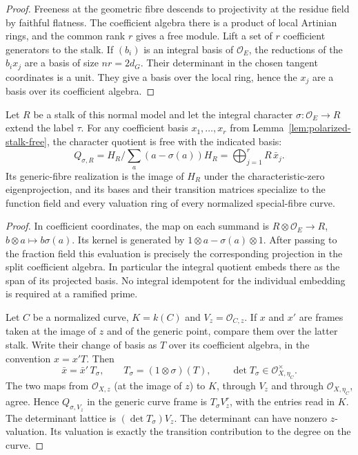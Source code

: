 \begin{proof}
Freeness at the geometric fibre descends to projectivity at the
residue field by faithful flatness. The coefficient algebra there
is a product of local Artinian rings, and the common rank \(r\)
gives a free module. Lift a set of \(r\) coefficient generators
to the stalk. If \((b_i)\) is an integral basis of \(\mathcal O_E\),
the reductions of the \(b_i x_j\) are a basis of size \(nr=2d_G\).
Their determinant in the chosen tangent coordinates is a unit.
They give a basis over the local ring, hence the \(x_j\) are a
basis over its coefficient algebra.
\end{proof}

\begin{auxlemma}
\label{lem:polarized-stalk-evaluation}
Let \(R\) be a stalk of this normal model and let the integral
character \(\sigma:\mathcal O_E\to R\) extend the label \(\tau\).
For any coefficient basis \(x_1,\ldots,x_r\) from
Lemma~\ref{lem:polarized-stalk-free}, the character quotient is
free with the indicated basis:
\[
 Q_{\sigma,R}=H_R/\sum_a(a-\sigma(a))H_R
             =\bigoplus_{j=1}^r R\,\bar x_j .
\]
Its generic-fibre realization is the image of \(H_R\) under
the characteristic-zero eigenprojection, and its bases and their
transition matrices specialize to the function field and every
valuation ring of every normalized special-fibre curve.
\end{auxlemma}
\begin{proof}
In coefficient coordinates, the map on each summand is
\(R\otimes\mathcal O_E\to R\), \(b\otimes a\mapsto b\sigma(a)\).
Its kernel is generated by \(1\otimes a-\sigma(a)\otimes1\).
After passing to the fraction field this evaluation is precisely the
corresponding projection in the split coefficient algebra. In
particular the integral quotient embeds there as the span of its
projected basis. No integral idempotent for the individual embedding
is required at a ramified prime.

Let \(C\) be a normalized curve, \(K=k(C)\) and
\(V_z=\mathcal O_{C,z}\). If \(x\) and \(x'\) are frames taken
at the image of \(z\) and of the generic point, compare them over
the latter stalk. Write their change of basis as \(T\) over its
coefficient algebra, in the convention \(x=x'T\). Then
\[
       \bar x=\bar x'\,T_\sigma,\qquad
       T_\sigma=(1\otimes\sigma)(T),\qquad
       \det T_\sigma\in\mathcal O_{X,\eta_C}^{\times}.
\]
The two maps from \(\mathcal O_{X,z}\) (at the image of \(z\))
to \(K\), through \(V_z\) and through \(\mathcal O_{X,\eta_C}\),
agree. Hence \(Q_{\sigma,V_z}\) in the generic curve frame
is \(T_\sigma V_z^r\), with the entries read in \(K\).
The determinant lattice is \((\det T_\sigma)V_z\). The determinant
can have nonzero \(z\)-valuation. Its valuation is exactly the
transition contribution to the degree on the curve.
\end{proof}

